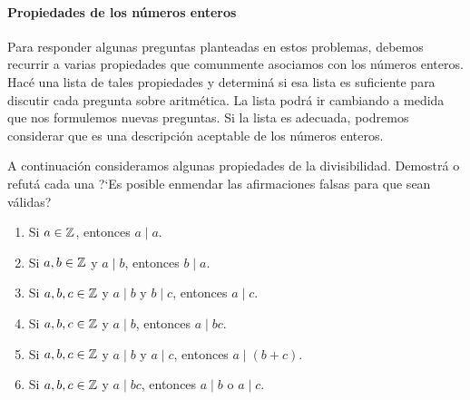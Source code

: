 \paragraph{Propiedades de los n\'umeros enteros}
Para responder algunas preguntas planteadas en estos problemas,
debemos recurrir a varias propiedades que comunmente asociamos
con los n\'umeros enteros. Hac\'e una lista de tales propiedades
y determin\'a si esa lista es suficiente para discutir cada pregunta
sobre aritm\'etica. La lista podr\'a ir cambiando a medida que
nos formulemos nuevas preguntas. Si la lista es adecuada,
podremos considerar que es una descripci\'on aceptable de los
n\'umeros enteros.

A continuaci\'on consideramos algunas propiedades de la divisibilidad.
Demostr\'a o refut\'a cada una
?`Es posible enmendar las afirmaciones falsas para que sean v\'alidas?
\begin{enumerate}[label=P\arabic*]
	\conti
	\item\label{item:divisibilidad:reflexiva}
		Si $a\in\mathbb{Z}$, entonces $a\mid a$.
	\item\label{item:divisibilidad:simetrica}
		Si $a,b\in\mathbb{Z}$ y $a\mid b$, entonces $b\mid a$.
	\item\label{item:divisibilidad:transitiva}
		Si $a,b,c\in\mathbb{Z}$ y $a\mid b$ y $b\mid c$,
		entonces $a\mid c$.
	\item\label{item:divisibilidad:multiplos}
		Si $a,b,c\in\mathbb{Z}$ y $a\mid b$, entonces $a\mid bc$.
	\item\label{item:divisibilidad:sumas}
		Si $a,b,c\in\mathbb{Z}$ y $a\mid b$ y $a\mid c$,
		entonces $a\mid (b+c)$.
	\item\label{item:divisibilidad:primos}
		Si $a,b,c\in\mathbb{Z}$ y $a\mid bc$, entonces
		$a\mid b$ o $a\mid c$.
	\seti
\end{enumerate}
%

